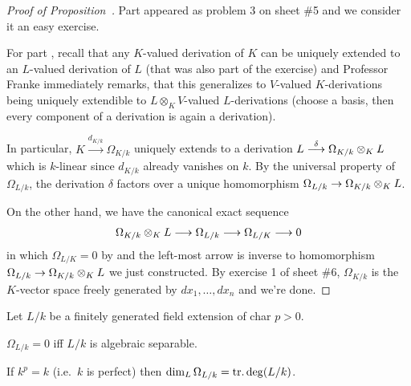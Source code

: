 \documentclass[a4paper,parskip=half,numbers=enddot, DIV=12, headheight=30pt]{scrreprt}
\begin{document}
\begin{proof}[Proof of Proposition~]
	Part  appeared as problem 3 on sheet \#5 and we consider it an easy exercise.
	
	For part , recall that any $K$-valued derivation of $K$ can be uniquely extended to an $L$-valued derivation of $L$ (that was also part of the exercise) and Professor Franke immediately remarks, that this generalizes to $V$-valued $K$-derivations being uniquely extendible to $L\otimes_KV$-valued $L$-derivations (choose a basis, then every component of a derivation is again a derivation). 
	
	In particular, $K\xrightarrow{d_{K/k}}\Omega_{K/k}$ uniquely extends to a derivation $L\morphism[\delta]\Omega_{K/k}\otimes_KL$ which is $k$-linear since $d_{K/k}$ already vanishes on $k$. By the universal property of $\Omega_{L/k}$, the derivation $\delta$ factors over a unique homomorphism $\Omega_{L/k}\morphism\Omega_{K/k}\otimes_K L$.
	
	On the other hand, we have the canonical exact sequence
	\begin{align*}
		\Omega_{K/k}\otimes_KL\morphism\Omega_{L/k}\morphism\Omega_{L/K}\morphism 0
	\end{align*}
	in which $\Omega_{L/K}=0$ by  and the left-most arrow is inverse to homomorphism $\Omega_{L/k}\morphism\Omega_{K/k}\otimes_K L$ we just constructed. By exercise 1 of sheet \#6, $\Omega_{K/k}$ is the $K$-vector space freely generated by $dx_1,\ldots,dx_n$ and we're done.
\end{proof}
\begin{prop}
    Let $L/k$ be a finitely generated field extension of char $p>0$. 
    \begin{alphanumerate}
      \item 
        $\Omega_{L/k} =0$ iff $L/k$ is algebraic separable.
      \item 
        If $k^p =k$ (i.e.\ $k$ is perfect) then $\dim_L\Omega_{L/k} = \operatorname{tr.deg}(L/k)$.
    \end{alphanumerate}
\end{prop}
\end{document}
